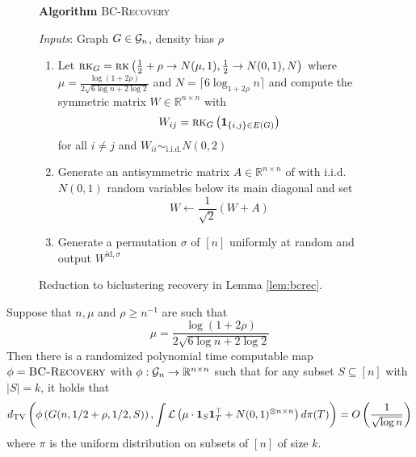 \begin{figure}[t!]
\begin{algbox}
\textbf{Algorithm} \textsc{BC-Recovery}

\vspace{2mm}

\textit{Inputs}: Graph $G \in \mathcal{G}_n$, density bias $\rho$
\begin{enumerate}
\item Let $\textsc{rk}_{G} = \textsc{rk}\left( \frac{1}{2} + \rho \to N(\mu, 1), \frac{1}{2} \to N(0, 1), N\right)$ where $\mu = \frac{\log (1 + 2\rho)}{2 \sqrt{6 \log n + 2\log 2}}$ and $N = \lceil 6 \log_{1 + 2 \rho} n \rceil$ and compute the symmetric matrix $W \in \mathbb{R}^{n \times n}$ with
$$W_{ij} = \textsc{rk}_G\left( \mathbf{1}_{\{i, j \} \in E(G)} \right)$$
for all $i \neq j$ and $W_{ii} \sim_{\text{i.i.d.}} N(0, 2)$
\item Generate an antisymmetric matrix $A \in \mathbb{R}^{n \times n}$ of with i.i.d. $N(0, 1)$ random variables below its main diagonal and set
$$W \gets \frac{1}{\sqrt{2}} \left( W + A \right)$$
\item Generate a permutation $\sigma$ of $[n]$ uniformly at random and output $W^{\text{id}, \sigma}$
\end{enumerate}
\vspace{1mm}
\end{algbox}
\caption{Reduction to biclustering recovery in Lemma \ref{lem:bcrec}.}
\label{fig:bcrec}
\end{figure}

\begin{lemma} \label{lem:bcrec}
Suppose that $n, \mu$ and $\rho \ge n^{-1}$ are such that
$$\mu = \frac{\log (1 + 2\rho)}{2 \sqrt{6 \log n + 2\log 2}}$$
Then there is a randomized polynomial time computable map $\phi = \textsc{BC-Recovery}$ with $\phi : \mathcal{G}_n \to \mathbb{R}^{n \times n}$ such that for any subset $S \subseteq [n]$ with $|S| = k$, it holds that
$$d_{\text{TV}}\left( \phi\left(G(n, 1/2 + \rho, 1/2, S)\right), \int \mathcal{L}\left( \mu \cdot \mathbf{1}_S \mathbf{1}_T^\top + N(0, 1)^{\otimes n \times n} \right) d\pi(T) \right) = O\left(\frac{1}{\sqrt{\log n}} \right)$$
where $\pi$ is the uniform distribution on subsets of $[n]$ of size $k$.
\end{lemma}


